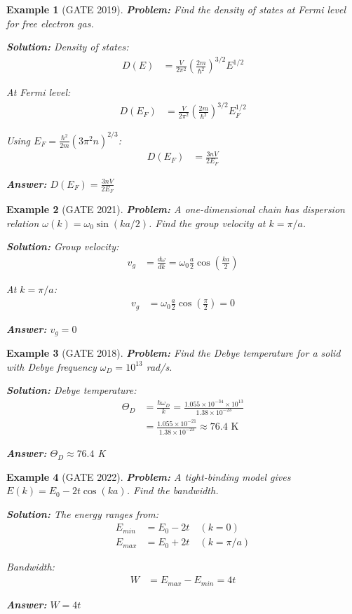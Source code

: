 \documentclass[12pt,a4paper]{article}
\newtheorem{example}{Example}[section]
\newcommand{\ans}[1]{\textcolor{red!70!black}{\textbf{Answer:} #1}}
\newcommand{\sol}{\textcolor{blue!70!black}{\textbf{Solution:}}}
\begin{document}
\begin{example}[GATE 2019]
\textbf{Problem:} Find the density of states at Fermi level for free electron gas.

\sol
Density of states:
\begin{align}
D(E) &= \frac{V}{2\pi^2}\left(\frac{2m}{\hbar^2}\right)^{3/2} E^{1/2}
\end{align}

At Fermi level:
\begin{align}
D(E_F) &= \frac{V}{2\pi^2}\left(\frac{2m}{\hbar^2}\right)^{3/2} E_F^{1/2}
\end{align}

Using $E_F = \frac{\hbar^2}{2m}(3\pi^2 n)^{2/3}$:
\begin{align}
D(E_F) &= \frac{3nV}{2E_F}
\end{align}

\ans{$D(E_F) = \frac{3nV}{2E_F}$}
\end{example}

\begin{example}[GATE 2021]
\textbf{Problem:} A one-dimensional chain has dispersion relation $\omega(k) = \omega_0 \sin(ka/2)$. Find the group velocity at $k = \pi/a$.

\sol
Group velocity:
\begin{align}
v_g &= \frac{d\omega}{dk} = \omega_0 \frac{a}{2} \cos\left(\frac{ka}{2}\right)
\end{align}

At $k = \pi/a$:
\begin{align}
v_g &= \omega_0 \frac{a}{2} \cos\left(\frac{\pi}{2}\right) = 0
\end{align}

\ans{$v_g = 0$}
\end{example}

\begin{example}[GATE 2018]
\textbf{Problem:} Find the Debye temperature for a solid with Debye frequency $\omega_D = 10^{13}$ rad/s.

\sol
Debye temperature:
\begin{align}
\Theta_D &= \frac{\hbar\omega_D}{k} = \frac{1.055 \times 10^{-34} \times 10^{13}}{1.38 \times 10^{-23}}\\
&= \frac{1.055 \times 10^{-21}}{1.38 \times 10^{-23}} \approx 76.4 \text{ K}
\end{align}

\ans{$\Theta_D \approx 76.4$ K}
\end{example}

\begin{example}[GATE 2022]
\textbf{Problem:} A tight-binding model gives $E(k) = E_0 - 2t\cos(ka)$. Find the bandwidth.

\sol
The energy ranges from:
\begin{align}
E_{min} &= E_0 - 2t \quad (k=0)\\
E_{max} &= E_0 + 2t \quad (k=\pi/a)
\end{align}

Bandwidth:
\begin{align}
W &= E_{max} - E_{min} = 4t
\end{align}

\ans{$W = 4t$}
\end{example}
\end{document}
